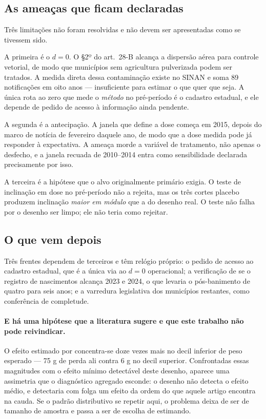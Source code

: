 \subsection{As ameaças que ficam declaradas}
\label{sub:ameacas-declaradas}

Três limitações não foram resolvidas e não devem ser apresentadas como se
tivessem sido.

A primeira é o \(d = 0\). O §2º do art.~28-B alcança a dispersão aérea para
controle vetorial, de modo que municípios sem agricultura pulverizada podem ser
tratados. A medida direta dessa contaminação existe no SINAN e soma 89
notificações em oito anos --- insuficiente para estimar o que quer que seja. A
única rota ao zero que mede o \emph{método} no pré-período é o cadastro estadual,
e ele depende de pedido de acesso à informação ainda pendente.

A segunda é a antecipação. A janela que define a dose começa em 2015, depois do
marco de notícia de fevereiro daquele ano, de modo que a dose medida pode já
responder à expectativa. A ameaça morde a variável de tratamento, não apenas o
desfecho, e a janela recuada de 2010--2014 entra como sensibilidade declarada
precisamente por isso.

A terceira é a hipótese que o alvo originalmente primário exigia. O teste de
inclinação em dose no pré-período não a rejeita, mas os três cortes placebo
produzem inclinação \emph{maior em módulo} que a do desenho real. O teste não
falha por o desenho ser limpo; ele não teria como rejeitar.

\subsection{O que vem depois}
\label{sub:depois}

Três frentes dependem de terceiros e têm relógio próprio: o pedido de acesso ao
cadastro estadual, que é a única via ao \(d = 0\) operacional; a verificação de
se o registro de nascimentos alcança 2023 e 2024, o que levaria o pós-banimento
de quatro para seis anos; e a varredura legislativa dos municípios restantes,
como conferência de completude.

\paragraph{E há uma hipótese que a literatura sugere e que este trabalho não
pode reivindicar.}
O efeito estimado por \citet{reynier2025glyphosate} concentra-se doze vezes mais
no decil inferior de peso esperado --- 75 g de perda ali contra 6 g no decil
superior. Confrontadas essas magnitudes com o efeito mínimo detectável deste
desenho, aparece uma assimetria que o diagnóstico agregado esconde: o desenho
não detecta o efeito médio, e detectaria com folga um efeito da ordem do que
aquele artigo encontra na cauda. Se o padrão distributivo se repetir aqui, o
problema deixa de ser de tamanho de amostra e passa a ser de escolha de
estimando.

